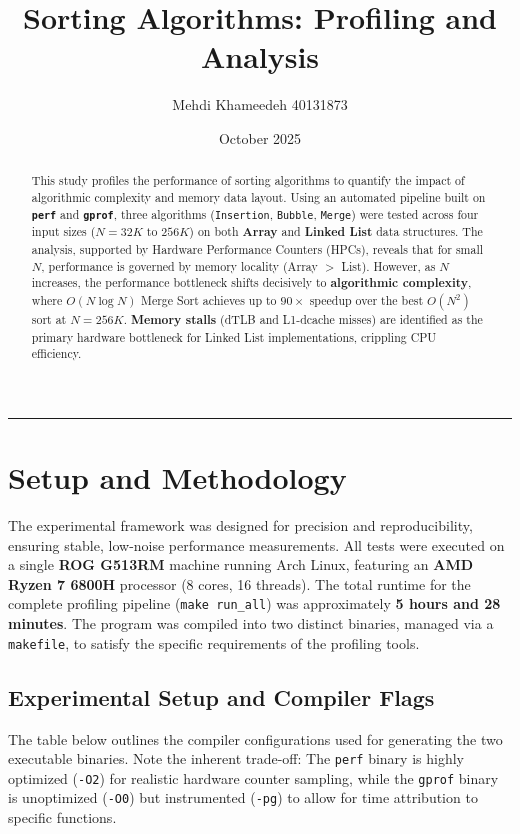 \documentclass[11pt, a4paper]{article}
\title{Sorting Algorithms: Profiling and Analysis}
\author{Mehdi Khameedeh 40131873}
\date{October 2025}
\begin{document}
\maketitle

\vspace{0.5cm}

\begin{abstract}
This study profiles the performance of sorting algorithms to quantify the impact of algorithmic complexity and memory data layout. Using an automated pipeline built on \textbf{\texttt{perf}} and \textbf{\texttt{gprof}}, three algorithms (\texttt{Insertion}, \texttt{Bubble}, \texttt{Merge}) were tested across four input sizes ($N=32K$ to $256K$) on both \textbf{Array} and \textbf{Linked List} data structures. The analysis, supported by Hardware Performance Counters (HPCs), reveals that for small $N$, performance is governed by memory locality (Array $>$ List). However, as $N$ increases, the performance bottleneck shifts decisively to \textbf{algorithmic complexity}, where $O(N \log N)$ Merge Sort achieves up to $90\times$ speedup over the best $O(N^2)$ sort at $N=256K$. \textbf{Memory stalls} (dTLB and L1-dcache misses) are identified as the primary hardware bottleneck for Linked List implementations, crippling CPU efficiency.
\end{abstract}

\hrule
\vspace{0.3cm}

\section{Setup and Methodology}

The experimental framework was designed for precision and reproducibility, ensuring stable, low-noise performance measurements. All tests were executed on a single \textbf{ROG G513RM} machine running Arch Linux, featuring an \textbf{AMD Ryzen 7 6800H} processor (8 cores, 16 threads). The total runtime for the complete profiling pipeline (\texttt{make run\_all}) was approximately \textbf{5 hours and 28 minutes}. The program was compiled into two distinct binaries, managed via a \texttt{makefile}, to satisfy the specific requirements of the profiling tools.

\subsection{Experimental Setup and Compiler Flags}
The table below outlines the compiler configurations used for generating the two executable binaries. Note the inherent trade-off: The \texttt{perf} binary is highly optimized (\texttt{-O2}) for realistic hardware counter sampling, while the \texttt{gprof} binary is unoptimized (\texttt{-O0}) but instrumented (\texttt{-pg}) to allow for time attribution to specific functions.
\end{document}
